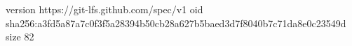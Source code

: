 version https://git-lfs.github.com/spec/v1
oid sha256:a3fd5a87a7c0f3f5a28394b50cb28a627b5baed3d7f8040b7c71da8e0c23549d
size 82
